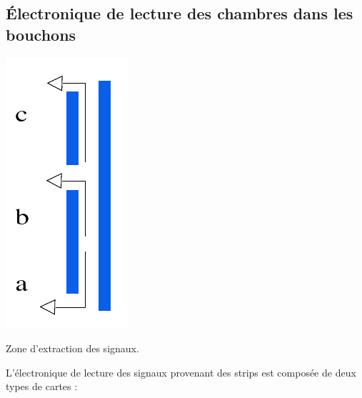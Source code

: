 \subsection{Électronique de lecture des chambres dans les bouchons}
\label{elecc}
\vspace{-0.2cm}
\marginpar
{
	\centering
	\includegraphics[width=\marginparwidth]{RPC/signalextraction.png}
	\captionsetup{type=subfigure}\caption{Zone d'extraction des signaux.}
	\label{extraction}
}
L'électronique de lecture des signaux provenant des strips est composée de deux types de cartes :
